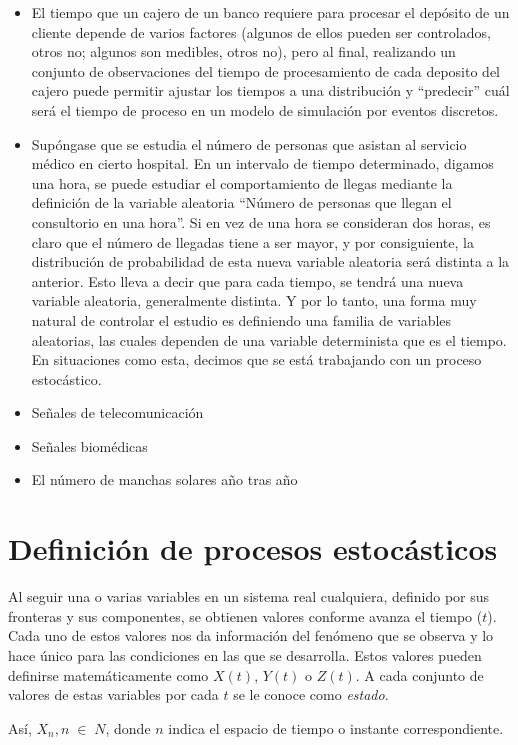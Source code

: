 \documentclass[11 pts, letterpaper, twosided]{article}
\begin{document}
\begin{itemize}
    \item El tiempo que un cajero de un banco requiere para procesar
    el depósito de un cliente depende de varios factores (algunos de
    ellos pueden ser controlados, otros no; algunos son medibles,
    otros no), pero al final, realizando un conjunto de observaciones
    del tiempo de procesamiento de cada deposito del cajero puede
    permitir ajustar los tiempos a una distribución y ``predecir''
    cuál será el tiempo de proceso en un modelo de simulación por
    eventos discretos.
    \item Supóngase que se estudia el número de personas que asistan
    al servicio médico en cierto hospital. En un intervalo de tiempo
    determinado, digamos una hora, se puede estudiar el comportamiento
    de llegas mediante la definición de la variable aleatoria ``Número
    de personas que llegan el consultorio en una hora''. Si en vez de
    una hora se consideran dos horas, es claro que el número de
    llegadas tiene a ser mayor, y por consiguiente, la distribución de
    probabilidad de esta nueva variable aleatoria será distinta a la
    anterior.  Esto lleva a decir que para cada tiempo, se tendrá una
    nueva variable aleatoria, generalmente distinta. Y por lo tanto,
    una forma muy natural de controlar el estudio es definiendo una
    familia de variables aleatorias, las cuales dependen de una
    variable determinista que es el tiempo. En situaciones como esta,
    decimos que se está trabajando con un proceso estocástico.
    \item Señales de telecomunicación
    \item Señales biomédicas
    \item El número de manchas solares año tras año
\end{itemize}

\section{Definición de procesos estocásticos}

Al seguir una o varias variables en un sistema real cualquiera,
definido por sus fronteras y sus componentes, se obtienen valores
conforme avanza el tiempo ($t$). Cada uno de estos valores nos da
información del fenómeno que se observa y lo hace único para las
condiciones en las que se desarrolla. Estos valores pueden definirse
matemáticamente como $X(t)$, $Y(t)$ o $Z(t)$. A cada conjunto de
valores de estas variables por cada $t$ se le conoce como
\emph{estado}.

Así, ${X_n, n \; \in \; N}$, donde $n$ indica el espacio de
tiempo o instante correspondiente.
\end{document}
